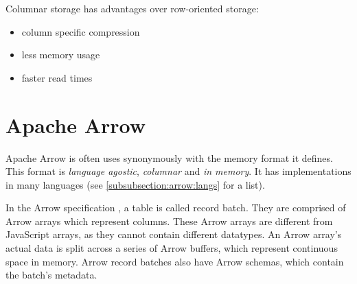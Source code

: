 Columnar storage has advantages over row-oriented storage:
\begin{itemize}
	\item column specific compression \autocite{Abadi2013}
	\item less memory usage \autocite{Abadi2013}
	\item faster read times \autocite{Floratou2019}
\end{itemize}


\section{Apache Arrow}
\label{section:arrow}

Apache Arrow is often uses synonymously with the memory format it defines.
This format is \emph{language agostic}, \emph{columnar} and \emph{in memory}.
It has implementations in many languages (see \ref{subsubsection:arrow:langs} for a list).

In the Arrow specification \autocite{arrow:spec}, a table is called record batch.
They are comprised of Arrow arrays which represent columns.
These Arrow arrays are different from JavaScript arrays, as they cannot contain different datatypes.
An Arrow array's actual data is split across a series of Arrow buffers, which represent continuous space in memory.
Arrow record batches also have Arrow schemas, which contain the batch's metadata.


